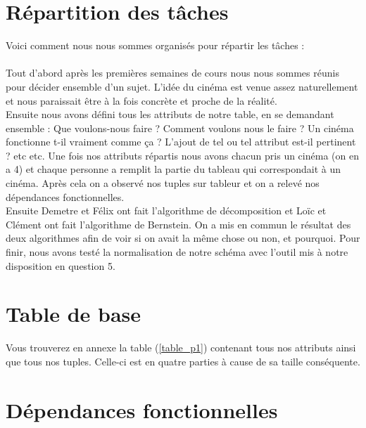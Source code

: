 \documentclass[a4paper,sffamily,12pt]{article}
\begin{document}
	\section{Répartition des tâches}

		\vspace{0.5cm}

		\noindent Voici comment nous nous sommes organisés pour répartir les tâches : \\
		\\
		\indent Tout d'abord après les premières semaines de cours nous nous sommes réunis pour décider ensemble d'un sujet. L'idée du cinéma est venue assez naturellement et nous paraissait être à la fois concrète et proche de la réalité.\\
		\indent Ensuite nous avons défini tous les attributs de notre table, en se demandant ensemble : Que voulons-nous faire ? Comment voulons nous le faire ? Un cinéma fonctionne t-il vraiment comme ça ? L'ajout de tel ou tel attribut est-il pertinent ? etc etc. Une fois nos attributs répartis nous avons chacun pris un cinéma (on en a 4) et chaque personne a remplit la partie du tableau qui correspondait à un cinéma. Après cela on a observé nos tuples sur tableur et on a relevé nos dépendances fonctionnelles.\\
		\indent Ensuite Demetre et Félix ont fait l'algorithme de décomposition et Loïc et Clément ont fait l'algorithme de Bernstein. On a mis en commun le résultat des deux algorithmes afin de voir si on avait la même chose ou non, et pourquoi. Pour finir, nous avons testé la normalisation de notre schéma avec l'outil mis à notre disposition en question 5.
						
		\vspace{0.5cm}
		
	\section{Table de base}	
		
		\vspace{0.5cm}
			
		Vous trouverez en annexe la table (\ref{table_p1}) contenant tous nos attributs ainsi que tous nos tuples. Celle-ci est en quatre parties à cause de sa taille conséquente.
		
		\vspace{0.5cm}						

	\section{Dépendances fonctionnelles}
	
\end{document}
